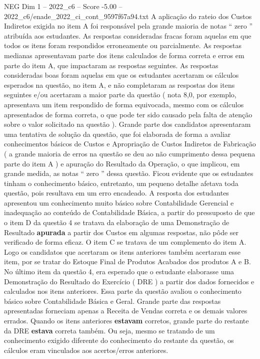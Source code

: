 \begin{textsample}{NEG Dim 1 – 2022\_c6 – Score -5.00 – 2022\_c6/enade\_2022\_ci\_cont\_9597f67a94.txt}
A aplicação do rateio dos Custos Indiretos exigida no item A foi responsável pela grande maioria de notas “ zero ” atribuída aos estudantes.
As respostas consideradas fracas foram aquelas em que todos os itens foram respondidos erroneamente ou parcialmente.
As respostas medianas apresentavam parte dos itens calculados de forma correta e erros em parte do item A, que impactaram as respostas seguintes.
As respostas consideradas boas foram aquelas em que os estudantes acertaram os cálculos esperados na questão, no item A, e não completaram as respostas dos itens seguintes e/ou acertaram a maior parte da questão ( nota 8,0, por exemplo, apresentava um item respondido de forma equivocada, mesmo com os cálculos apresentados de forma correta, o que pode ter sido causado pela falta de atenção sobre o valor solicitado na questão ).
Grande parte dos candidatos apresentaram uma tentativa de solução da questão, que foi elaborada de forma a avaliar conhecimentos básicos de Custos e Apropriação de Custos Indiretos de Fabricação ( a grande maioria de erros na questão se deu ao não cumprimento dessa pequena parte do item A ) e apuração do Resultado da Operação, o que implicou, em grande medida, as notas “ zero ” dessa questão.
Ficou evidente que os estudantes tinham o conhecimento básico, entretanto, um pequeno detalhe afetava toda questão, pois resultava em um erro encadeado.
A resposta dos estudantes apresentou um conhecimento muito básico sobre Contabilidade Gerencial e inadequação ao conteúdo de Contabilidade Básica, a partir do pressuposto de que o item D da questão 4 se tratava da elaboração de uma Demonstração de Resultado \textbf{apurada} a partir dos Custos em algumas respostas, não pôde ser verificado de forma eficaz.
O item C se tratava de um complemento do item A.
Logo os candidatos que acertaram os itens anteriores também acertaram esse item, por se tratar do Estoque Final de Produtos Acabados dos produtos A e B.
No último item da questão 4, era esperado que o estudante elaborasse uma Demonstração do Resultado do Exercício ( DRE ) a partir dos dados fornecidos e calculados nos itens anteriores.
Essa parte da questão avaliou o conhecimento básico sobre Contabilidade Básica e Geral.
Grande parte das respostas apresentadas forneciam apenas a Receita de Vendas correta e os demais valores errados.
Quando os itens anteriores \textbf{estavam} corretos, grande parte do restante da DRE \textbf{estava} correta também.
Ou seja, mesmo se tratando de um conhecimento exigido diferente do conhecimento do restante da questão, os cálculos eram vinculados aos acertos/erros anteriores.

\end{textsample}
